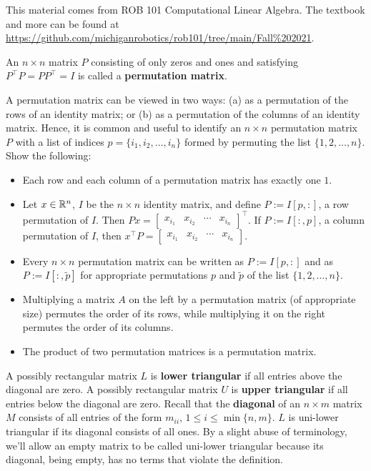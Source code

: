This material comes from ROB 101 Computational Linear Algebra. The textbook and more can be found at \url{https://github.com/michiganrobotics/rob101/tree/main/Fall%202021}.

\begin{definition}
An $n \times n$ matrix $P$ consisting of only zeros and ones and satisfying $P^\top P = P P^\top = I$ is called a \textbf{permutation matrix}. 
\end{definition}

\begin{exercise} A permutation matrix can be viewed in two ways: (a) as a permutation of the rows of an identity matrix; or (b) as a permutation of the columns of an identity matrix. Hence, it is common and useful to identify an $n \times n$ permutation matrix $P$ with a list of indices $p= \{ i_1, i_2, \ldots, i_n\}$ formed by permuting the list $\{1, 2, \ldots, n\}$. Show the following:
\begin{itemize}
\item Each row and each column of a permutation matrix has exactly one $1$. 
    \item Let $x\in \mathbb R^n$, $I$ be the $n \times n$ identity matrix, and define $P:=I[p,:]$, a row permutation of $I$. Then $Px = \begin{bmatrix} x_{i_1} & x_{i_2} & \cdots & x_{i_n} \end{bmatrix}^\top$. If $P:=I[:,p]$, a column permutation of $I$, then $x^\top P = \begin{bmatrix} x_{i_1} & x_{i_2} & \cdots & x_{i_n} \end{bmatrix}$. 
    \item Every $n \times n$ permutation matrix can be written as $P:=I[p,:]$ and as $P:=I[:,\widetilde{p}]$ for appropriate permutations $p$ and $\widetilde{p}$ of the list $\{1, 2, \ldots, n\}$.
    \item Multiplying a matrix $A$ on the left by a permutation matrix (of appropriate size) permutes the order of its rows, while multiplying it on the right permutes the order of its columns.
    \item The product of two permutation matrices is a permutation matrix.
    \end{itemize}
\end{exercise}


\begin{definition}
A possibly rectangular matrix $L$ is \textbf{lower triangular} if all entries above the diagonal are zero. A possibly rectangular matrix $U$ is \textbf{upper triangular} if all entries below the diagonal are zero. Recall that the \textbf{diagonal} of an $n \times m$ matrix $M$ consists of all entries of the form $m_{ii}$, $1 \le i \le \min\{n, m\}$. $L$ is uni-lower triangular if its diagonal consists of all ones. By a slight abuse of terminology, we'll allow an empty matrix to be called uni-lower triangular because its diagonal, being empty, has no terms that violate the definition.
\end{definition}

